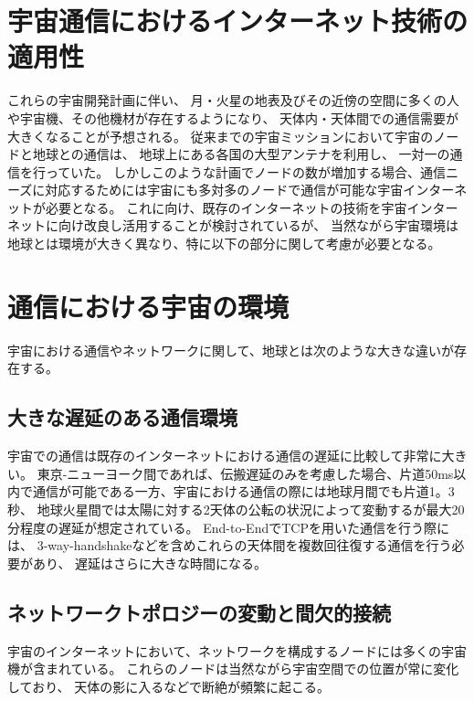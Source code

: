 \section{宇宙通信におけるインターネット技術の適用性}
\label{section:宇宙通信におけるインターネット技術の適用性}
これらの宇宙開発計画に伴い、 月・火星の地表及びその近傍の空間に多くの人や宇宙機、その他機材が存在するようになり、
天体内・天体間での通信需要が大きくなることが予想される。 
従来までの宇宙ミッションにおいて宇宙のノードと地球との通信は、 地球上にある各国の大型アンテナを利用し、 一対一の通信を行っていた。
しかしこのような計画でノードの数が増加する場合、通信ニーズに対応するためには宇宙にも多対多のノードで通信が可能な宇宙インターネットが必要となる。 
これに向け、既存のインターネットの技術を宇宙インターネットに向け改良し活用することが検討されているが、
当然ながら宇宙環境は地球とは環境が大きく異なり、特に以下の部分に関して考慮が必要となる。

\section{通信における宇宙の環境}
\label{section:通信における宇宙の環境}
宇宙における通信やネットワークに関して、地球とは次のような大きな違いが存在する。


\subsection{大きな遅延のある通信環境}
\label{subsection:大きな遅延のある通信環境}
宇宙での通信は既存のインターネットにおける通信の遅延に比較して非常に大きい。
東京-ニューヨーク間であれば、伝搬遅延のみを考慮した場合、片道50ms以内で通信が可能である一方、宇宙における通信の際には地球月間でも片道1。3秒、
地球火星間では太陽に対する2天体の公転の状況によって変動するが最大20分程度の遅延が想定されている。
End-to-EndでTCPを用いた通信を行う際には、 3-way-handshakeなどを含めこれらの天体間を複数回往復する通信を行う必要があり、 
遅延はさらに大きな時間になる。 
\cite{McBrayer2022}


\subsection{ネットワークトポロジーの変動と間欠的接続}
\label{subsection:ネットワークトポロジーの変動と間欠的接続}
宇宙のインターネットにおいて、ネットワークを構成するノードには多くの宇宙機が含まれている。
これらのノードは当然ながら宇宙空間での位置が常に変化しており、
 天体の影に入るなどで断絶が頻繁に起こる。 

